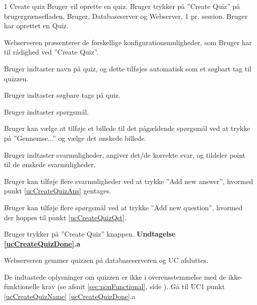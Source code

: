 
\uchead
	{1}
	{Create quiz}
	{Bruger vil oprette en quiz.}
	{Bruger trykker på ''Create Quiz'' på brugergrænsefladen.}
	{Bruger, Databaseserver og Webserver.}
	{}
	{1 pr. session.}
	{Bruger har oprettet en Quiz.}

\item Webserveren præsenterer de forskellige konfigurationsmuligheder, som Bruger har til rådighed ved ''Create Quiz''.

\item \label{ucCreateQuizName} Bruger indtaster navn på quiz, og dette tilføjes automatisk som et søgbart tag til quizzen.

\item Bruger indtaster søgbare tags på quiz.

\item \label{ucCreateQuizQst} Bruger indtaster spørgsmål.

\item Bruger kan vælge at tilføje et billede til det pågældende spørgsmål ved at trykke på ''Gennemse...'' og vælge det ønskede billede.

\item \label{ucCreateQuizAns} Bruger indtaster svarmuligheder, angiver det/de korrekte svar, og tildeler point til de ønskede svarmuligheder.

\item Bruger kan tilføje flere svarmuligheder ved at trykke ''Add new answer'', hvormed punkt \ref{ucCreateQuizAns} gentages.

\item Bruger kan tilføje flere spørgsmål ved at trykke ''Add new question'', hvormed der hoppes til punkt \ref{ucCreateQuizQst}.

\item \label{ucCreateQuizDone} Bruger trykker på ''Create Quiz'' knappen.
\textbf{Undtagelse \ref{ucCreateQuizDone}.a}

\item \label{ucCreateQuizDB} Webserveren gemmer quizzen på databaseserveren og UC afsluttes.

\ucdescriptionend

\ucextension
	{De indtastede oplysninger om quizzen er ikke i overensstemmelse med de ikke-funktionelle krav (se afsnit \ref{sec:nonFunctional}, side \pageref{sec:nonFunctional}).}
	{Gå til UC1 punkt \ref{ucCreateQuizName}}
	{\ref{ucCreateQuizDone}.a}
		
